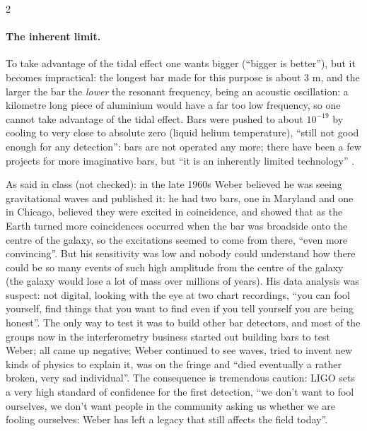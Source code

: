 \begin{paracol}{2}
\paragraph{The inherent limit.} To take advantage of the tidal effect one wants bigger (``bigger is better''), but it becomes impractical: the longest bar made for this purpose is about $3$ m, and the larger the bar the \emph{lower} the resonant frequency, being an acoustic oscillation: a kilometre long piece of aluminium would have a far too low frequency, so one cannot take advantage of the tidal effect. Bars were pushed to about $10^{-19}$ by cooling to very close to absolute zero (liquid helium temperature), ``still not good enough for any detection'': bars are not operated any more; there have been a few projects for more imaginative bars, but ``it is an inherently limited technology'' .

\begin{history}
As said in class (not checked): in the late 1960s Weber believed he was seeing gravitational waves and published it: he had two bars, one in Maryland and one in Chicago, believed they were excited in coincidence, and showed that as the Earth turned more coincidences occurred when the bar was broadside onto the centre of the galaxy, so the excitations seemed to come from there, ``even more convincing''. But his sensitivity was low and nobody could understand how there could be so many events of such high amplitude from the centre of the galaxy (the galaxy would lose a lot of mass over millions of years). His data analysis was suspect: not digital, looking with the eye at two chart recordings, ``you can fool yourself, find things that you want to find even if you tell yourself you are being honest''. The only way to test it was to build other bar detectors, and most of the groups now in the interferometry business started out building bars to test Weber; all came up negative; Weber continued to see waves, tried to invent new kinds of physics to explain it, was on the fringe and ``died eventually a rather broken, very sad individual''. The consequence is tremendous caution: LIGO sets a very high standard of confidence for the first detection, ``we don't want to fool ourselves, we don't want people in the community asking us whether we are fooling ourselves: Weber has left a legacy that still affects the field today''.
\end{history}


\end{paracol}
